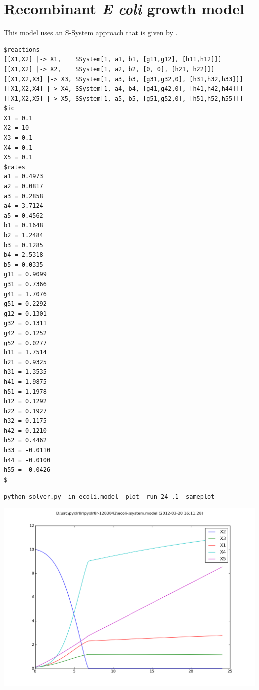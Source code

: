 \section{Recombinant \textit{E coli} growth model}

This model uses an S-System approach that is given by \cite{ecoli}.

\begin{changemargin}{1.25in}{1in}
\begin{scriptsize}
\begin{Verbatim}[frame=single,xrightmargin=\leftmargin]
$reactions
[[X1,X2] |-> X1,    SSystem[1, a1, b1, [g11,g12], [h11,h12]]]
[[X1,X2] |-> X2,    SSystem[1, a2, b2, [0, 0], [h21, h22]]]
[[X1,X2,X3] |-> X3, SSystem[1, a3, b3, [g31,g32,0], [h31,h32,h33]]]
[[X1,X2,X4] |-> X4, SSystem[1, a4, b4, [g41,g42,0], [h41,h42,h44]]]
[[X1,X2,X5] |-> X5, SSystem[1, a5, b5, [g51,g52,0], [h51,h52,h55]]]
$ic
X1 = 0.1
X2 = 10
X3 = 0.1
X4 = 0.1
X5 = 0.1
$rates
a1 = 0.4973
a2 = 0.0817
a3 = 0.2858
a4 = 3.7124
a5 = 0.4562
b1 = 0.1648
b2 = 1.2484
b3 = 0.1285
b4 = 2.5318
b5 = 0.0335
g11 = 0.9099
g31 = 0.7366
g41 = 1.7076
g51 = 0.2292
g12 = 0.1301
g32 = 0.1311
g42 = 0.1252
g52 = 0.0277
h11 = 1.7514
h21 = 0.9325
h31 = 1.3535
h41 = 1.9875
h51 = 1.1978
h12 = 0.1292
h22 = 0.1927
h32 = 0.1175
h42 = 0.1210
h52 = 0.4462
h33 = -0.0110
h44 = -0.0100
h55 = -0.0426
$
\end{Verbatim}
\end{scriptsize}
\end{changemargin}


\begin{center}
{\tt  python solver.py -in ecoli.model -plot -run 24 .1 -sameplot}
\end{center}

\begin{center}
\includegraphics[width=.7\textwidth]{ecoli-ssystem.png}
\end{center}


